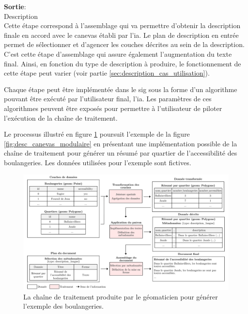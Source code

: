\begin{enumerate}
        \textbf{Sortie}:\\
        \hspace*{1cm}Description\\
        Cette étape correspond à l’assemblage qui va permettre d'obtenir la description finale en accord avec le canevas établi par l’\gls{ia}. Le plan de description en entrée permet de sélectionner et d’agencer les couches décrites au sein de la description. C'est cette étape d'assemblage qui assure également l'augmentation du texte final. Ainsi, en fonction du type de description à produire, le fonctionnement de cette étape peut varier (voir partie \ref{sec:description_cas_utilisation}).
\end{enumerate}

Chaque étape peut être implémentée dans le \gls{sig} sous la forme d’un algorithme pouvant être exécuté par l'utilisateur final, l'\gls{ia}. Les paramètres de ces algorithmes peuvent être exposés pour permettre à l’utilisateur de piloter l’exécution de la chaîne de traitement.

\newpar{}

Le processus illustré en figure \ref{fig:desc_chaine_sig} poursuit l'exemple de la figure \ref{fig:desc_canevas_modulaire} en présentant une implémentation possible de la chaîne de traitement pour générer un résumé par quartier de l'accessibilité des boulangeries. Les données utilisées pour l'exemple sont fictives. 

\begin{figure}[ht]
    \centering
    \includegraphics[width=\textwidth]{images/description/exemple_chaine.pdf}
    \caption[Chaîne de traitement de réalisation de description]{La chaîne de traitement produite par le géomaticien pour générer l'exemple des boulangeries.}
    \label{fig:desc_chaine_sig}
\end{figure}

